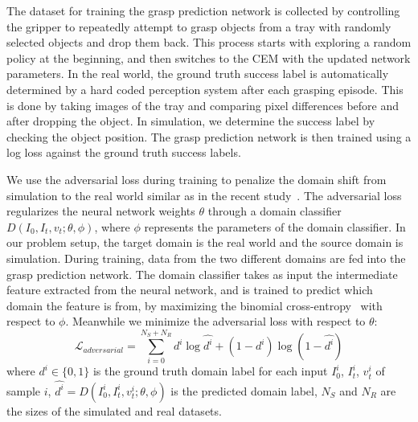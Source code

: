 \documentclass[letterpaper, 10 pt, conference]{ieeeconf}  %
\begin{document}
The dataset for training the grasp prediction network is collected by controlling the gripper to repeatedly attempt to grasp objects from a tray with randomly selected objects and drop them back. This process starts with exploring a random policy at the beginning, and then switches to the CEM with the updated network parameters. In the real world, the ground truth success label is automatically determined by a hard coded perception system after each grasping episode. This is done by taking images of the tray and comparing pixel differences before and after dropping the object. In simulation, we determine the success label by checking the object position. The grasp prediction network is then trained using a log loss against the ground truth success labels.

We use the adversarial loss \cite{ganin2016domain} during training to penalize the domain shift from simulation to the real world similar as in the recent study~\cite{bousmalis-2018}. The adversarial loss regularizes the neural network weights $\theta$ through a domain classifier $D(I_0, I_t, v_t; \theta, \phi)$, where $\phi$ represents the parameters of the domain classifier. In our problem setup, the target domain is the real world and the source domain is simulation. During training, data from the two different domains are fed into the grasp prediction network. The domain classifier takes as input the intermediate feature extracted from the neural network, and is trained to predict which domain the feature is from, by maximizing the binomial cross-entropy~\cite{ganin2016domain} with respect to $\phi$. Meanwhile we minimize the adversarial loss with respect to $\theta$: 
\begin{equation}
    \mathcal{L}_{adversarial} = \sum_{i = 0}^{N_S + N_R} d^i \log \hat{d^i} + (1 - d^i) \log (1 - \hat{d^i})
\end{equation}
where $d^i \in \{0, 1\}$ is the ground truth domain label for each input $I_0^i$, $I_t^i$, $v_t^i$ of sample $i$, $\hat{d^i} = D(I_0^i, I_t^i, v_t^i; \theta, \phi)$ is the predicted domain label, $N_S$ and $N_R$ are the sizes of the simulated and real datasets.
\end{document}
